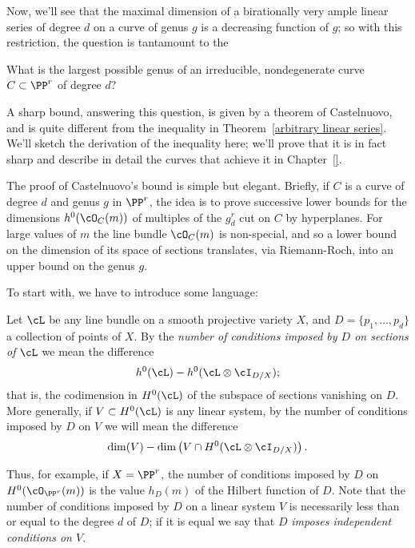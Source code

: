 Now, we'll see that the maximal dimension of a birationally very ample linear series of degree $d$ on a curve of genus $g$ is a decreasing function of $g$; so with this restriction, the question is tantamount to the

\begin{question}
What is the largest possible genus of an irreducible, nondegenerate curve $C \subset \PP^r$ of degree $d$?
\end{question}

A sharp bound, answering  this question, is given by a theorem of Castelnuovo, and is quite different from the inequality in Theorem~\ref{arbitrary linear series}.  We'll sketch the derivation of the inequality here; we'll prove that it is in fact sharp and describe in detail  the curves that achieve it in Chapter~\ref{}. 

The proof of Castelnuovo's bound is simple but elegant. Briefly, if $C$ is a curve of degree $d$ and genus $g$ in $\PP^r$, the idea is to prove successive lower bounds for the dimensions $h^0(\cO_C(m))$ of multiples of the $g^r_d$ cut on $C$ by hyperplanes. For large values of $m$ the line bundle $\cO_C(m)$ is non-special, and so a lower bound on the dimension of its space of sections translates, via Riemann-Roch, into an upper bound on the genus $g$.

To start with, we have to introduce some language:

\begin{definition}
Let $\cL$ be any line bundle on a smooth projective variety $X$, and $D = \{p_1,\dots,p_d\}$ a collection of points of $X$. By the \emph{number of conditions imposed by $D$ on sections of $\cL$} we  mean  the difference
$$
h^0(\cL) - h^0(\cL \otimes \cI_{D/X});
$$
that is, the codimension in $H^0(\cL)$ of the subspace of sections vanishing on $D$. More generally, if $V \subset H^0(\cL)$ is any linear system, by the number of conditions imposed by $D$ on $V$ we will mean the difference
$$
\dim(V) - \dim \left(V \cap H^0(\cL\otimes \cI_{D/X}) \right).
$$
\end{definition}

Thus, for example, if $X = \PP^r$, the number of conditions imposed by $D$ on $H^0(\cO_{\PP^r}(m))$ is the value $h_D(m)$ of the Hilbert function of $D$.
Note that the number of conditions imposed by $D$ on a linear system $V$ is necessarily less than or equal to the degree $d$ of $D$; if it is equal we say that $D$ \emph{imposes independent conditions on $V$}.

